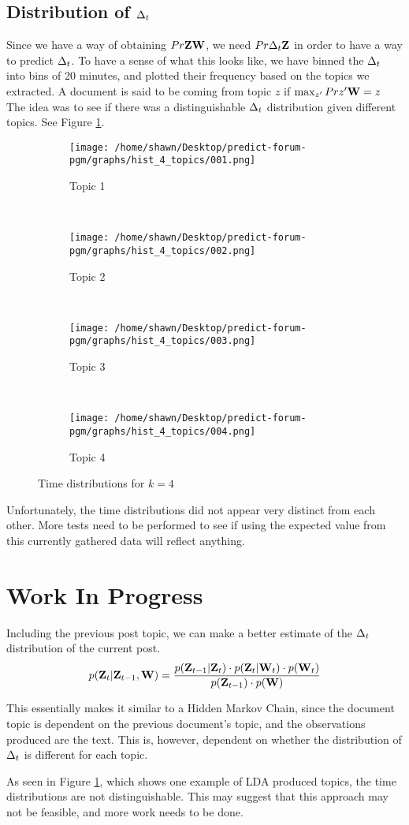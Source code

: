 \subsection{Distribution of $\Delta_t$}
Since we have a way of obtaining $Pr{\mathbf{Z}}{\mathbf{W}}$, we need $Pr{\Delta_t}{\mathbf{Z}}$ in order to 
have a way to predict $\Delta_t$. To have a sense of what this looks like, we have 
binned the $\Delta_t$ into bins of 20 minutes, and plotted their frequency based on 
the topics we extracted. A document is said to be coming from topic $z$ if 
$\max_{z'} Pr{z'}{\mathbf{W}} = z$
The idea was to see if there was a distinguishable $\Delta_t$ distribution given 
different topics. See Figure \ref{fig:time_dist}.
\begin{figure}
\centering
\begin{subfigure}[b]{0.5\textwidth}
	\centering
	\texttt{[image: /home/shawn/Desktop/predict-forum-pgm/graphs/hist\_4\_topics/001.png]}
	\caption{Topic 1}
\end{subfigure}%
~ %
\begin{subfigure}[b]{0.5\textwidth}
	\centering
	\texttt{[image: /home/shawn/Desktop/predict-forum-pgm/graphs/hist\_4\_topics/002.png]}
	\caption{Topic 2}
\end{subfigure} \\
\begin{subfigure}[b]{0.5\textwidth}
	\centering
	\texttt{[image: /home/shawn/Desktop/predict-forum-pgm/graphs/hist\_4\_topics/003.png]}
	\caption{Topic 3}
\end{subfigure}%
~%
\begin{subfigure}[b]{0.5\textwidth}
	\centering
	\texttt{[image: /home/shawn/Desktop/predict-forum-pgm/graphs/hist\_4\_topics/004.png]}
	\caption{Topic 4}
\end{subfigure}
\caption{Time distributions for $k = 4$}\label{fig:time_dist}
\end{figure}

Unfortunately, the time distributions did not appear very distinct from each 
other. More tests need to be performed to see if using the expected value from 
this currently gathered data will reflect anything.
\section{Work In Progress}
Including the previous post topic, we can make a better estimate of the $\Delta_t$ 
distribution of the current post.
\[
	p(\mathbf{Z}_t|\mathbf{Z}_{t-1},\mathbf{W})=
	\frac{p(\mathbf{Z}_{t-1}|\mathbf{Z}_t) \cdot p(\mathbf{Z}_t|\mathbf{W}_t) \cdot p(\mathbf{W}_t)}{
	p(\mathbf{Z}_{t-1})\cdot p(\mathbf{W})}
\]

This essentially makes it similar to a Hidden Markov Chain, since the document 
topic is dependent on the previous document's topic, and the observations 
produced are the text. This is, however, dependent on whether the distribution 
of $\Delta_t$ is different for each topic.

As seen in Figure \ref{fig:time_dist}, which shows one example of LDA produced 
topics, the time distributions are not distinguishable. This may suggest that 
this approach may not be feasible, and more work needs to be done.

